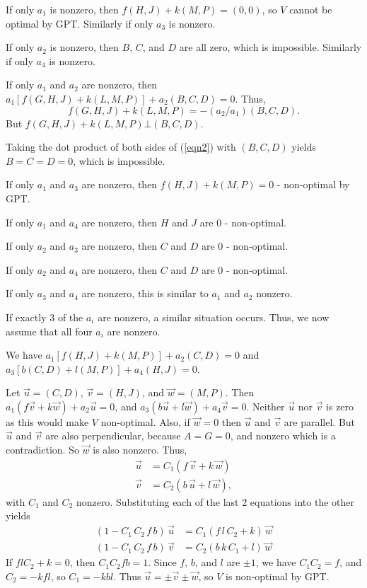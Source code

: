 If only $a_1$ is nonzero, then $f(H,J) + k(M,P) = (0,0)$, so $V$ cannot be
optimal by GPT.  Similarly if only $a_3$ is nonzero.

If only $a_2$ is nonzero, then $B$, $C$, and $D$ are all zero, which is
impossible.  Similarly if only $a_4$ is nonzero.

If only $a_1$ and $a_2$ are nonzero, then $a_1 [f(G,H,J)+k(L,M,P)] + a_2
(B,C,D) = 0$. Thus,
\begin{equation}
\label{eqn2}
f(G,H,J) + k(L,M,P) = -(a_2/a_1)(B,C,D).
\end{equation}
But $f(G,H,J)+k(L,M,P) \bot (B,C,D)$.

Taking the dot product of both sides of (\ref{eqn2}) with $(B,C,D)$ yields $B
= C = D = 0$, which is impossible.

If only $a_1$ and $a_3$ are nonzero, then $f(H,J)+k(M,P) = 0$ - non-optimal by
GPT.

If only $a_1$ and $a_4$ are nonzero, then $H$ and $J$ are 0 - non-optimal.

If only $a_2$ and $a_3$ are nonzero, then $C$ and $D$ are 0 - non-optimal.

If only $a_2$ and $a_4$ are nonzero, then $C$ and $D$ are 0 - non-optimal.

If only $a_3$ and $a_4$ are nonzero, this is similar to $a_1$ and $a_2$
\label{refpage7}
nonzero.

If exactly 3 of the $a_i$ are nonzero, a similar situation occurs.  Thus, we
now assume that all four $a_i$ are nonzero.

We have
$a_1[f(H,J)+k(M,P)] + a_2(C,D) = 0$ and
$a_3[b(C,D)+l(M,P)] + a_4(H,J) = 0$.

Let $\vec{u} = (C,D)$, $\vec{v} = (H,J)$, and $\vec{w} = (M,P)$.  Then
$a_1(f \vec{v} + k \vec{w}) + a_2 \vec{u} = 0$, and
$a_3(b \vec{u} + l \vec{w}) + a_4 \vec{v} = 0$.  Neither $\vec{u}$ nor
$\vec{v}$ is zero as this would make $V$ non-optimal.  Also, if $\vec{w} = 0$
then $\vec{u}$ and $\vec{v}$ are parallel.  But $\vec{u}$ and $\vec{v}$ are
also perpendicular, because $A = G = 0$, and nonzero which is a contradiction.
So $\vec{w}$ is also nonzero.  Thus,
\begin{align*}
\vec{u} & = C_1 (f\,\vec{v} + k\,\vec{w}) \\
\vec{v} & = C_2 (b\,\vec{u} + l\,\vec{w}),
\end{align*}
with $C_1$ and $C_2$ nonzero.  Substituting each of the last 2 equations into
the other yields
\begin{align}
\label{eqn3}
(1 - C_1\,C_2\,f\,b)\,\vec{u} & = C_1 (f\,l\,C_2 + k)\,\vec{w} \\
\label{eqn4}
(1 - C_1\,C_2\,f\,b)\,\vec{v} & = C_2 (b\,k\,C_1 + l)\,\vec{w}
\end{align}
If $f l C_2+k = 0$, then $C_1 C_2 f b = 1$.  Since $f$, $b$, and $l$ are
$\pm 1$, we have $C_1 C_2 = f $, and $C_2 = -k f l$, so $C_1 = -k b l$.
Thus $\vec{u} = \pm \vec{v} \pm \vec{w}$, so $V$ is non-optimal by GPT.

